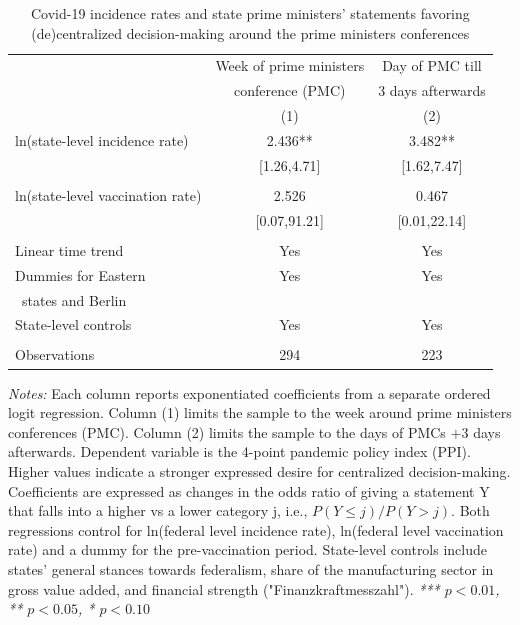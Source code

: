 \begin{table}[htbp]
\caption{Covid-19 incidence rates and state prime ministers' statements favoring (de)centralized decision-making around the prime ministers conferences}
\begin{tabular}{lcc} \toprule
    & Week of prime ministers & Day of PMC till \\
    & conference (PMC)        & 3 days afterwards \\
    & (1) & (2) \\ 		\midrule
ln(state-level incidence rate) & 2.436** & 3.482** \\
    & [1.26,4.71] & [1.62,7.47]  \\
    & & \\
ln(state-level vaccination rate) & 2.526 & 0.467 \\
    & [0.07,91.21] & [0.01,22.14]  \\
    & & \\
Linear time trend & Yes & Yes \\
Dummies for Eastern & Yes & Yes \\
\, states and Berlin & & \\
State-level controls & Yes & Yes \\
& & \\ \midrule
Observations & 294 & 223 \\ \bottomrule
\end{tabular}
\label{tb.regpmc}
\begin{minipage}{\textwidth}
\small
\textit{Notes:} Each column reports exponentiated coefficients from a separate ordered logit regression. Column (1) limits the sample to the week around prime ministers conferences (PMC). Column (2) limits the sample to the days of PMCs $+ 3$ days afterwards. Dependent variable is the 4-point pandemic policy index (PPI). Higher values indicate a stronger expressed desire for centralized decision-making. Coefficients are expressed as changes in the odds ratio of giving a statement Y that falls into a higher vs a lower category j, i.e., $P(Y\leq j)/P(Y>j)$. Both regressions control for ln(federal level incidence rate), ln(federal level vaccination rate) and a dummy for the pre-vaccination period. State-level controls include states' general stances towards federalism, share of the manufacturing sector in gross value added, and financial strength ("Finanzkraftmesszahl"). \newline \textit{*** $p < 0.01$, ** $p < 0.05$, * $p < 0.10$}
	\end{minipage}
\end{table}